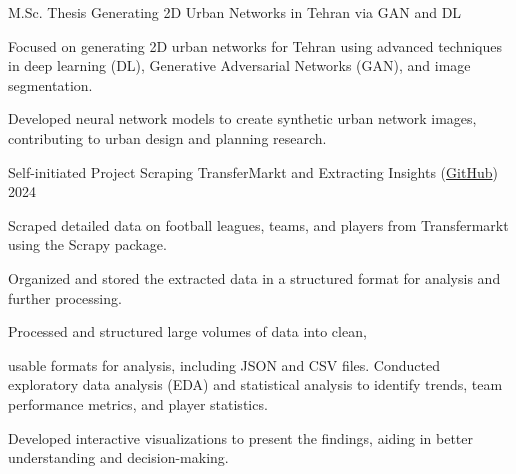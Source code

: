 
\begin{cventries}
	
	\cventry
	{M.Sc. Thesis} %
	{Generating 2D Urban Networks in Tehran via GAN and DL} %
	{} %
	{} %
	{
		\begin{cvitems} %
			\item{Focused on generating 2D urban networks for Tehran using advanced techniques in deep learning (DL), Generative Adversarial Networks (GAN), and image segmentation.}
			\item{Developed neural network models to create synthetic urban network images, contributing to urban design and planning research.}
		\end{cvitems}
	}
	
	\cventry
	{Self-initiated Project} %
	{Scraping TransferMarkt and Extracting Insights (\href{https://github.com/mohammedbehjoo/transfermark_scrapy}{GitHub})} %
	{} %
	{\textcolor{neutraltext}{2024}} %
	{
		\begin{cvitems} %
			\item{Scraped detailed data on football leagues, teams, and players from Transfermarkt using the Scrapy package.}
			\item{Organized and stored the extracted data in a structured format for analysis and further processing.}
			\item Processed and structured large volumes of data into clean, \item usable formats for analysis, including JSON and CSV files.
			Conducted exploratory data analysis (EDA) and statistical analysis to identify trends, team performance metrics, and player statistics.
			\item{Developed interactive visualizations to present the findings, aiding in better understanding and decision-making.}
		\end{cvitems}
	}
	


\end{cventries}
